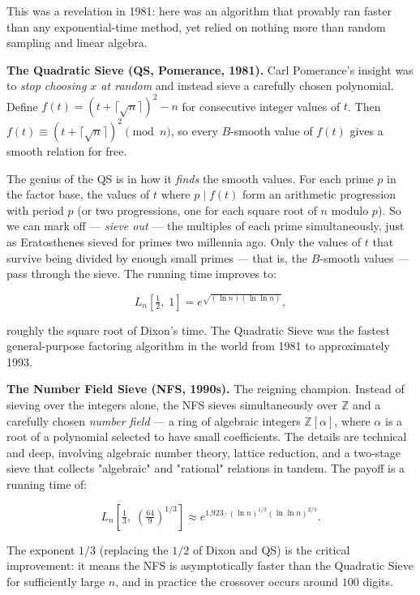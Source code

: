 This was a revelation in 1981: here was an algorithm that provably ran faster than any exponential-time method, yet relied on nothing more than random sampling and linear algebra.

\textbf{The Quadratic Sieve (QS, Pomerance, 1981).} Carl Pomerance's insight was to \textit{stop choosing $x$ at random} and instead sieve a carefully chosen polynomial. Define $f(t) = (t + \lceil \sqrt{n} \rceil)^2 - n$ for consecutive integer values of $t$. Then $f(t) \equiv (t + \lceil \sqrt{n} \rceil)^2 \pmod{n}$, so every $B$-smooth value of $f(t)$ gives a smooth relation for free.

The genius of the QS is in how it \textit{finds} the smooth values. For each prime $p$ in the factor base, the values of $t$ where $p \mid f(t)$ form an arithmetic progression with period $p$ (or two progressions, one for each square root of $n$ modulo $p$). So we can mark off --- \textit{sieve out} --- the multiples of each prime simultaneously, just as Eratosthenes sieved for primes two millennia ago. Only the values of $t$ that survive being divided by enough small primes --- that is, the $B$-smooth values --- pass through the sieve. The running time improves to:

\[L_n\!\left[\tfrac{1}{2}, \; 1\right] = e^{\sqrt{(\ln n)(\ln \ln n)}},\]

roughly the square root of Dixon's time. The Quadratic Sieve was the fastest general-purpose factoring algorithm in the world from 1981 to approximately 1993.

\textbf{The Number Field Sieve (NFS, 1990s).} The reigning champion. Instead of sieving over the integers alone, the NFS sieves simultaneously over $\mathbb{Z}$ and a carefully chosen \textit{number field} --- a ring of algebraic integers $\mathbb{Z}[\alpha]$, where $\alpha$ is a root of a polynomial selected to have small coefficients. The details are technical and deep, involving algebraic number theory, lattice reduction, and a two-stage sieve that collects "algebraic" and "rational" relations in tandem. The payoff is a running time of:

\[L_n\!\left[\tfrac{1}{3}, \; \left(\tfrac{64}{9}\right)^{\!1/3}\right] \approx e^{1.923 \cdot (\ln n)^{1/3} (\ln \ln n)^{2/3}}.\]

The exponent $1/3$ (replacing the $1/2$ of Dixon and QS) is the critical improvement: it means the NFS is asymptotically faster than the Quadratic Sieve for sufficiently large $n$, and in practice the crossover occurs around $100$ digits.

